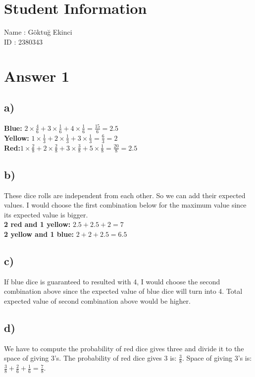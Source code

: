\documentclass[12pt]{article}
\begin{document}
\section*{Student Information}

Name : Göktuğ Ekinci\\

ID : 2380343 \\


\section*{Answer 1}
\subsection*{a)}

\textbf{Blue:} $2 \times \frac{4}{6} + 3 \times \frac{1}{6} + 4 \times \frac{1}{6} = \frac{15}{6} = 2.5$ \\


\textbf{Yellow:} $1 \times \frac{1}{3} + 2 \times \frac{1}{3} + 3 \times \frac{1}{3} = \frac{6}{3} = 2$\\


\textbf{Red:}$1 \times \frac{2}{8} + 2 \times \frac{2}{8} + 3 \times \frac{3}{8} + 5 \times \frac{1}{8} = \frac{20}{8} = 2.5$\\
\subsection*{b)}
These dice rolls are independent from each other. So we can add their expected values. I would choose the first combination below for the maximum value since its expected value is bigger.\\

\textbf{2 red and 1 yellow:} $ 2.5 + 2.5 + 2 = 7$\\

\textbf{2 yellow and 1 blue:} $ 2 + 2 + 2.5 = 6.5$
\subsection*{c)}
If blue dice is guaranteed to resulted with 4, I would choose the second combination above since the expected value of blue dice will turn into 4. Total expected value of second combination above would be higher.

\subsection*{d)}
We have to compute the probability of red dice gives three and divide it to the space of giving 3's. The probability of red dice gives 3 is: $\frac{3}{8}$. Space of giving 3's is: $\frac{3}{8} + \frac{2}{6} + \frac{1}{6} = \frac{7}{8}$.\\
\end{document}
